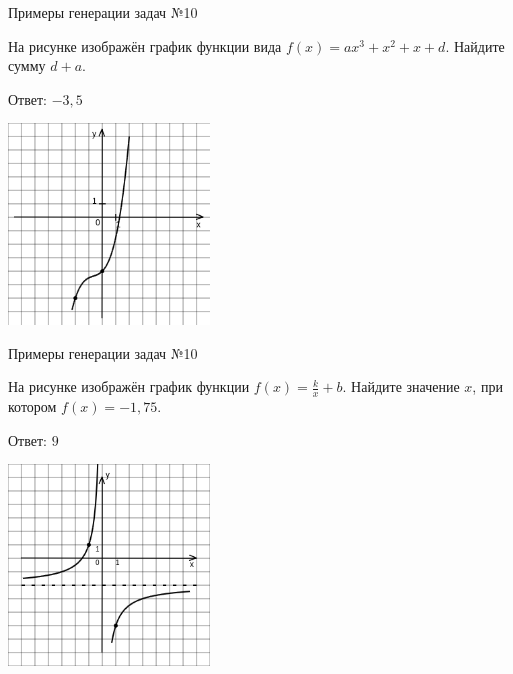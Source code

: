 \documentclass[aspectratio=169]{beamer}
\begin{document}
\begin{frame}{Примеры генерации задач №10}
    \begin{multicols}{2}
          
        На рисунке изображён график функции вида $f(x)=ax^3+x^2+x+d$. Найдите сумму $d+a$.

        Ответ: $-3,5$
        

        \includegraphics[width=0.4\textwidth]{images/293185407352766n0}
    \end{multicols}
         
\end{frame}

\begin{frame}{Примеры генерации задач №10}
    \begin{multicols}{2}
        На рисунке изображён график функции $f(x)=\frac{k}{x}+b$. Найдите значение $x$, при котором $f(x)=-1,75$.

        Ответ: $9$

        \includegraphics[width=0.4\textwidth]{images/5535657652049n0.png}
    \end{multicols}
    
\end{frame}
\end{document}
